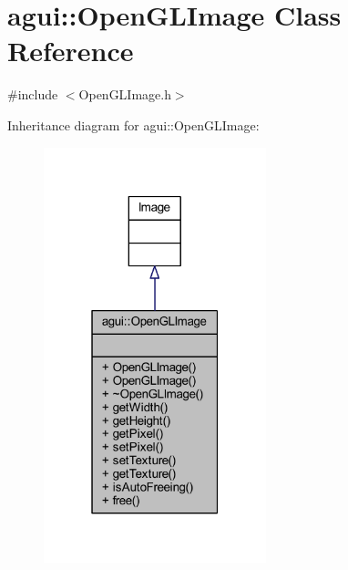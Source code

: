 \hypertarget{classagui_1_1_open_g_l_image}{}\section{agui\+:\+:Open\+G\+L\+Image Class Reference}
\label{classagui_1_1_open_g_l_image}


{\ttfamily \#include $<$Open\+G\+L\+Image.\+h$>$}



Inheritance diagram for agui\+:\+:Open\+G\+L\+Image\+:
\nopagebreak
\begin{figure}[H]
\begin{center}
\leavevmode
\includegraphics[width=183pt]{classagui_1_1_open_g_l_image__inherit__graph}
\end{center}
\end{figure}


